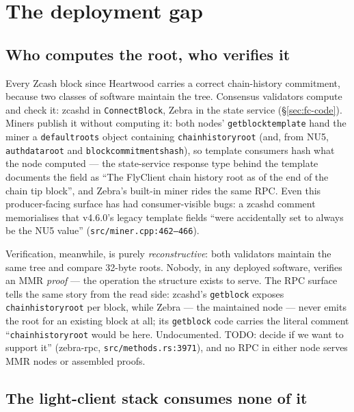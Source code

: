 \documentclass[11pt,a4paper]{article}
\theoremstyle{definition}
\begin{document}
\section{The deployment gap}\label{sec:fc-gap}

\subsection{Who computes the root, who verifies it}\label{sec:fc-who}

Every Zcash block since Heartwood carries a correct chain-history
commitment, because two classes of software maintain the tree. Consensus
validators compute and check it: zcashd in \texttt{ConnectBlock}, Zebra
in the state service (\S\ref{sec:fc-code}). Miners publish it without
computing it: both nodes' \texttt{getblocktemplate} hand the miner a
\texttt{defaultroots} object containing \texttt{chainhistoryroot} (and,
from NU5, \texttt{authdataroot} and \texttt{blockcommitmentshash}), so
template consumers hash what the node computed --- the state-service
response type behind the template documents the field as ``The FlyClient
chain history root as of the end of the chain tip block'', and Zebra's
built-in miner rides the same RPC.
Even this producer-facing surface has had consumer-visible bugs: a
zcashd comment memorialises that v4.6.0's legacy template fields ``were
accidentally set to always be the NU5 value''
(\texttt{src/miner.cpp:462--466}).

Verification, meanwhile, is purely \emph{reconstructive}: both
validators maintain the same tree and compare 32-byte roots. Nobody, in
any deployed software, verifies an MMR \emph{proof} --- the operation
the structure exists to serve. The RPC surface tells the same story
from the read side: zcashd's \texttt{getblock} exposes
\texttt{chainhistoryroot} per block, while Zebra --- the maintained
node --- never emits the root for an existing block at all; its
\texttt{getblock} code carries the literal comment
``\texttt{chainhistoryroot} would be here. Undocumented. TODO: decide
if we want to support it'' (\textsf{zebra-rpc},
\texttt{src/methods.rs:3971}), and no RPC in either node serves MMR
nodes or assembled proofs.

\subsection{The light-client stack consumes none of it}
\label{sec:fc-lightstack}
\end{document}
